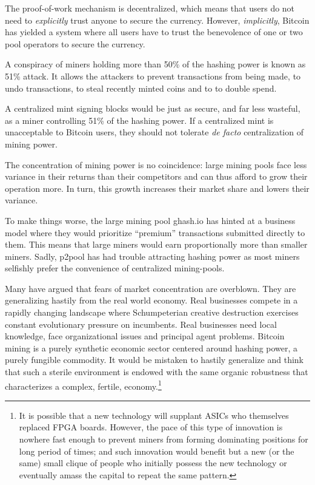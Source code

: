 \documentclass[letterpaper]{article}
\begin{document}
The proof-of-work mechanism is decentralized, which means that users do not
need to \emph{explicitly} trust anyone to secure the currency. However,
\emph{implicitly}, Bitcoin has yielded a system where all users have to trust
the benevolence of one or two pool operators to secure the currency.

A conspiracy of miners holding more than 50\% of the hashing power
is known as 51\% attack\cite{51pct}. It allows the attackers
to prevent transactions from being made, to undo transactions,
to steal recently minted coins and to to double spend\cite{centralized}.

A centralized mint signing blocks would be just as secure,
and far less wasteful, as a miner controlling 51\% of the hashing power.
If a centralized mint is unacceptable to Bitcoin users,
they should not tolerate \textit{de facto} centralization of mining power.

The concentration of mining power is no coincidence:
large mining pools face less variance in their returns than their competitors
and can thus afford to grow their operation more.
In turn, this growth increases their market share and lowers their variance.

To make things worse, the large mining pool ghash.io
has hinted at a business model where they would prioritize ``premium''
transactions submitted directly to them. This means that large miners would earn
proportionally more than smaller miners. Sadly, p2pool has had trouble
attracting hashing power as most miners selfishly prefer the convenience of
centralized mining-pools.

Many have argued that fears of market concentration are
overblown. They are generalizing hastily from the real world economy.
Real businesses compete in a rapidly changing landscape
where Schumpeterian creative destruction exercises
constant evolutionary pressure on incumbents.
Real businesses need local knowledge, face organizational issues
and principal agent problems. Bitcoin mining is a purely synthetic economic
sector centered around hashing power, a purely fungible commodity.
It would be mistaken to hastily generalize and think that such a sterile
environment is endowed with the same organic robustness that characterizes a
complex, fertile, economy.\footnote{It is possible that a new technology
will supplant ASICs who themselves replaced FPGA boards. However, the pace of
this type of innovation is nowhere fast enough to prevent miners from forming
dominating positions for long period of times; and such innovation would benefit
but a new (or the same) small clique of people who initially possess the new
technology or eventually amass the capital to repeat the same pattern.}
\end{document}
